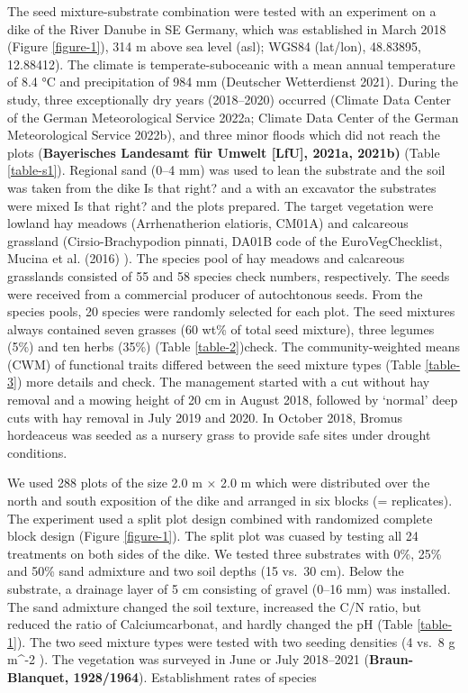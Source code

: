 \documentclass[
]{article}
\begin{document}
The seed mixture-substrate combination were tested with an experiment on a dike of the River Danube in SE Germany, which was established in March 2018 (Figure \ref{figure-1}), 314 m above sea level (asl); WGS84 (lat/lon), 48.83895, 12.88412). The climate is temperate-suboceanic with a mean annual temperature of 8.4 °C and precipitation of 984 mm (Deutscher Wetterdienst 2021). During the study, three exceptionally dry years (2018--2020) occurred (Climate Data Center of the German Meteorological Service 2022a; Climate Data Center of the German Meteorological Service 2022b), and three minor floods which did not reach the plots (\textbf{Bayerisches Landesamt für Umwelt {[}LfU{]}, 2021a, 2021b)} (Table \ref{table-s1}). Regional sand (0--4 mm) was used to lean the substrate and the soil was taken from the dike Is that right? and a with an excavator the substrates were mixed Is that right? and the plots prepared. The target vegetation were lowland hay meadows (Arrhenatherion elatioris, CM01A) and calcareous grassland (Cirsio-Brachypodion pinnati, DA01B code of the EuroVegChecklist, Mucina et al. (2016) ). The species pool of hay meadows and calcareous grasslands consisted of 55 and 58 species check numbers, respectively. The seeds were received from a commercial producer of autochtonous seeds. From the species pools, 20 species were randomly selected for each plot. The seed mixtures always contained seven grasses (60 wt\% of total seed mixture), three legumes (5\%) and ten herbs (35\%) (Table \ref{table-2})check. The community-weighted means (CWM) of functional traits differed between the seed mixture types (Table \ref{table-3}) more details and check. The management started with a cut without hay removal and a mowing height of 20 cm in August 2018, followed by `normal' deep cuts with hay removal in July 2019 and 2020. In October 2018, Bromus hordeaceus was seeded as a nursery grass to provide safe sites under drought conditions.

We used 288 plots of the size 2.0 m × 2.0 m which were distributed over the north and south exposition of the dike and arranged in six blocks (= replicates). The experiment used a split plot design combined with randomized complete block design (Figure \ref{figure-1}). The split plot was cuased by testing all 24 treatments on both sides of the dike. We tested three substrates with 0\%, 25\% and 50\% sand admixture and two soil depths (15 vs.~30 cm). Below the substrate, a drainage layer of 5 cm consisting of gravel (0--16 mm) was installed. The sand admixture changed the soil texture, increased the C/N ratio, but reduced the ratio of Calciumcarbonat, and hardly changed the pH (Table \ref{table-1}). The two seed mixture types were tested with two seeding densities (4 vs.~8 g m\^{}-2 ). The vegetation was surveyed in June or July 2018--2021 (\textbf{Braun-Blanquet, 1928/1964}). Establishment rates of species
\end{document}
